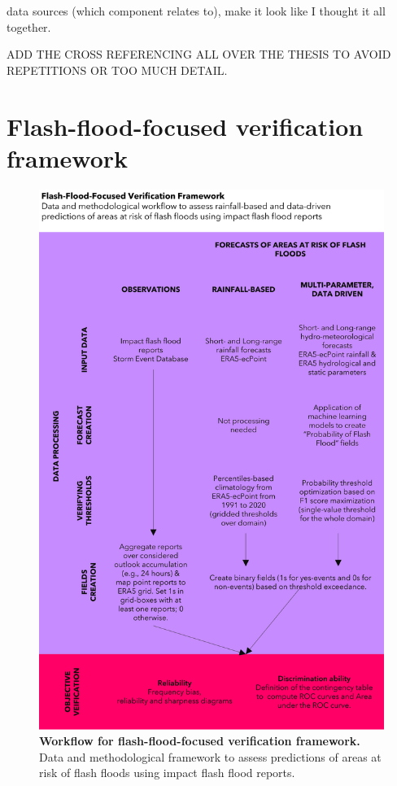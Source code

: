 data sources (which component relates to), make it look like I thought it all together.

ADD THE CROSS REFERENCING ALL OVER THE THESIS TO AVOID REPETITIONS OR TOO MUCH DETAIL.


\section{Flash-flood-focused verification framework}

\begin{figure}[htbp]
\centering
\includegraphics[width=\textwidth]{workflow_verif_framework.png}
\caption{\textbf{Workflow for flash-flood-focused verification framework.} Data and methodological framework to assess predictions of areas at risk of flash floods using impact flash flood reports.}
\label{fig:workflow_verif_framework}
\end{figure}

